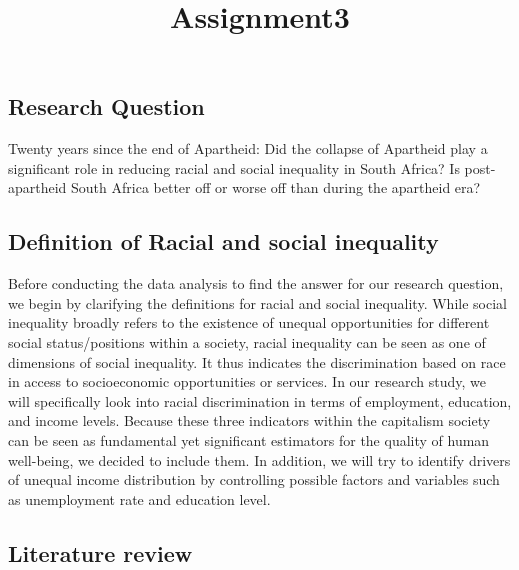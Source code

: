 \documentclass[]{article}
\title{Assignment3}
\author{}
\date{}
\begin{document}
\maketitle

\subsection{Research Question}\label{research-question}

Twenty years since the end of Apartheid: Did the collapse of Apartheid
play a significant role in reducing racial and social inequality in
South Africa? Is post-apartheid South Africa better off or worse off
than during the apartheid era?

\subsection{Definition of Racial and social
inequality}\label{definition-of-racial-and-social-inequality}

Before conducting the data analysis to find the answer for our research
question, we begin by clarifying the definitions for racial and social
inequality. While social inequality broadly refers to the existence of
unequal opportunities for different social status/positions within a
society, racial inequality can be seen as one of dimensions of social
inequality. It thus indicates the discrimination based on race in access
to socioeconomic opportunities or services. In our research study, we
will specifically look into racial discrimination in terms of
employment, education, and income levels. Because these three indicators
within the capitalism society can be seen as fundamental yet significant
estimators for the quality of human well-being, we decided to include
them. In addition, we will try to identify drivers of unequal income
distribution by controlling possible factors and variables such as
unemployment rate and education level.

\subsection{Literature review}\label{literature-review}
\end{document}
